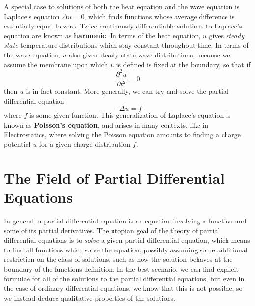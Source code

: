 A special case to solutions of both the heat equation and the wave equation is Laplace's equation $\Delta u = 0$, which finds functions whose average difference is essentially equal to zero. Twice continously differentiable solutions to Laplace's equation are known as {\bf harmonic}. In terms of the heat equation, $u$ gives {\it steady state} temperature distributions which stay constant throughout time. In terms of the wave equation, $u$ also gives steady state wave distributions, because we assume the membrane upon which $u$ is defined is fixed at the boundary, so that if
%
\[ \frac{\partial^2 u}{\partial t^2} = 0 \]
%
then $u$ is in fact constant. More generally, we can try and solve the partial differential equation
%
\[ - \Delta u = f \]
%
where $f$ is some given function. This generalization of Laplace's equation is known as {\bf Poisson's equation}, and arises in many contexts, like in Electrostatics, where solving the Poisson equation amounts to finding a charge potential $u$ for a given charge distribution $f$.

\section{The Field of Partial Differential Equations}

In general, a partial differential equation is an equation involving a function and some of its partial derivatives. The utopian goal of the theory of partial differential equations is to {\it solve} a given partial differential equation, which means to find all functions which solve the equation, possibly assuming some additional restriction on the class of solutions, such as how the solution behaves at the boundary of the functions definition. In the best scenario, we can find explicit formulae for all of the solutions to the partial differential equations, but even in the case of ordinary differential equations, we know that this is not possible, so we instead deduce qualitative properties of the solutions.

